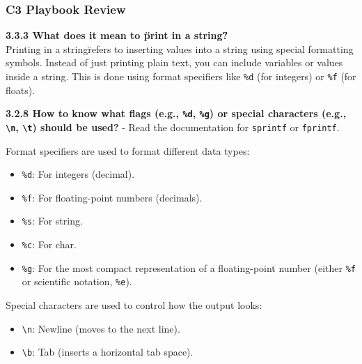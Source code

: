 \documentclass[
	11pt, %
]{beamer}
\begin{document}
\begin{frame}
    \frametitle{C3 Playbook Review}
    
    \textbf{3.3.3 What does it mean to \"print in a string\"?} \\
    \"Printing in a string\" refers to inserting values into a string using special formatting symbols. Instead of just printing plain text, you can include variables or values inside a string. This is done using format specifiers like \texttt{\%d} (for integers) or \texttt{\%f} (for floats).
    
    \textbf{3.2.8 How to know what flags (e.g., \texttt{\%d}, \texttt{\%g}) or special characters (e.g., \texttt{\textbackslash n}, \texttt{\textbackslash t}) should be used?}
    - Read the documentation for \texttt{sprintf} or \texttt{fprintf}.
    
    Format specifiers are used to format different data types:
    \begin{itemize}
        \item \texttt{\%d}: For integers (decimal).
        \item \texttt{\%f}: For floating-point numbers (decimals).
        \item \texttt{\%s}: For string.
        \item \texttt{\%c}: For char.
        \item \texttt{\%g}: For the most compact representation of a floating-point number (either \texttt{\%f} or scientific notation, \texttt{\%e}).
    \end{itemize}

    Special characters are used to control how the output looks:
    \begin{itemize}
        \item \texttt{\textbackslash n}: Newline (moves to the next line).
        \item \texttt{\textbackslash b}: Tab (inserts a horizontal tab space).
    \end{itemize}

\end{frame}



\end{document}
